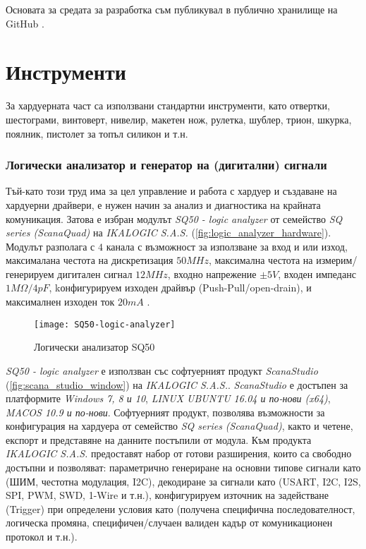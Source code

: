 Основата за средата за разработка съм публикувал в публично хранилище на GitHub \cite{github_stm32_base}.

\FloatBarrier


\section{Инструменти}

За хардуерната част са използвани стандартни инструменти, като отвертки, шестограми, винтоверт, нивелир, макетен нож, рулетка, шублер, трион, шкурка, поялник, пистолет за топъл силикон и т.н.


\subsubsection{Логически анализатор и генератор на (дигитални) сигнали}
\FloatBarrier
Тъй-като този труд  има за цел управление и работа с хардуер и 
създаване на хардуерни драйвери, е нужен начин за анализ и диагностика на крайната комуникация.
Затова е избран модулът \textit{SQ50 - logic analyzer } от семейство \textit{SQ series (ScanaQuad)} на  \textit{IKALOGIC S.A.S.} (\autoref{fig:logic_analyzer_hardware}).
Модулът разполага с \(4\) канала с възможност за използване за вход и или изход,
максималана честота на дискретизация \(50MHz\),
максимална честота на измерим/генерируем дигитален сигнал \(12MHz\), 
входно напрежение \(\pm 5V\),
входен импеданс \(1M\Omega/4pF\),
kонфигурируем изходен драйвър (Push-Pull/open-drain),
и максималнен изходен ток \(20mA\) \cite{manual_sq50}.

\begin{figure}[hbpt!]
    \centering
    \texttt{[image: SQ50-logic-analyzer]}
    \caption{Логически анализатор SQ50}
    \label{fig:logic_analyzer_hardware}
\end{figure}


\FloatBarrier

\textit{SQ50 - logic analyzer } е използван със софтуерният продукт \textit{ScanaStudio} (\autoref{fig:scana_studio_window}) на \textit{IKALOGIC S.A.S.}.
\textit{ScanaStudio} е достъпен за платформите \textit{Windows 7, 8 и 10}, \textit{LINUX UBUNTU 16.04 и по-нови (x64)}, \textit{MACOS 10.9 и по-нови}.
Софтуерният продукт, позволява възможности за конфигурация на хардуера от семейство \textit{SQ series (ScanaQuad)}, както и четене, експорт и представяне на
данните постъпили от модула.
Към продукта \textit{IKALOGIC S.A.S.} предоставят набор от готови разширения, 
които са свободно достъпни и позволяват:
параметрично генериране на основни типове сигнали като (ШИМ, честотна модулация, I2C),
декодиране за сигнали като (USART, I2C, I2S, SPI, PWM, SWD, 1-Wire и т.н.),
конфигурируем източник на задействане (Trigger) при определени условия като 
(получена специфична последователност, логическа промяна, специфичен/случаен валиден кадър от комуникационен протокол и т.н.).


